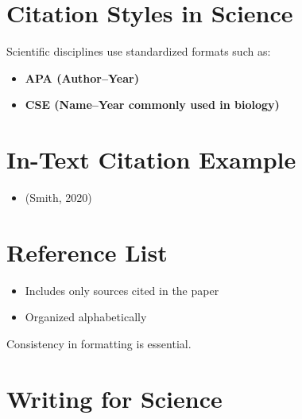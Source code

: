 \documentclass[
  letterpaper,
  DIV=11,
  numbers=noendperiod]{scrreprt}
\providecommand{\tightlist}{%
  \setlength{\itemsep}{0pt}\setlength{\parskip}{0pt}}
\begin{document}
\section*{\texorpdfstring{\textbf{Citation Styles in
Science}}{Citation Styles in Science}}\label{citation-styles-in-science}


Scientific disciplines use standardized formats such as:

\begin{itemize}
\item
  \textbf{APA (Author--Year)}
\item
  \textbf{CSE (Name--Year commonly used in biology)}
\end{itemize}

\section*{\texorpdfstring{\textbf{In-Text Citation
Example}}{In-Text Citation Example}}\label{in-text-citation-example}


\begin{itemize}
\tightlist
\item
  (Smith, 2020)
\end{itemize}

\section*{\texorpdfstring{\textbf{Reference
List}}{Reference List}}\label{reference-list}


\begin{itemize}
\item
  Includes only sources cited in the paper
\item
  Organized alphabetically
\end{itemize}

Consistency in formatting is essential.

\section*{\texorpdfstring{\textbf{Writing for
Science}}{Writing for Science}}\label{writing-for-science}
\end{document}
